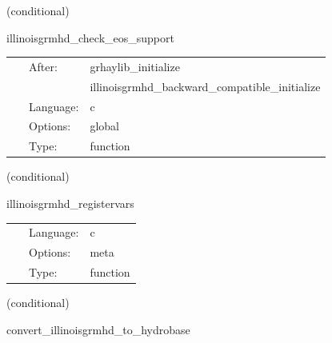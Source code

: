 \documentclass{article}
\begin{document}
   (conditional) 

\hspace{5mm} illinoisgrmhd\_check\_eos\_support 

\hspace{5mm}{\it validate supported entropy contracts and install stable simple thermodynamics } 


\hspace{5mm}

 \begin{tabular*}{160mm}{cll} 
~ & After:  & grhaylib\_initialize \\ 
~& ~ &illinoisgrmhd\_backward\_compatible\_initialize\\ 
~ & Language:  & c \\ 
~ & Options:  & global \\ 
~ & Type:  & function \\ 
\end{tabular*} 


\vspace{5mm}

   (conditional) 

\hspace{5mm} illinoisgrmhd\_registervars 

\hspace{5mm}{\it register evolved, rhs variables in illinoisgrmhd for mol } 


\hspace{5mm}

 \begin{tabular*}{160mm}{cll} 
~ & Language:  & c \\ 
~ & Options:  & meta \\ 
~ & Type:  & function \\ 
\end{tabular*} 


\vspace{5mm}

   (conditional) 

\hspace{5mm} convert\_illinoisgrmhd\_to\_hydrobase 

\hspace{5mm}{\it convert illinoisgrmhd-native variables to hydrobase } 


\hspace{5mm}
\end{document}
